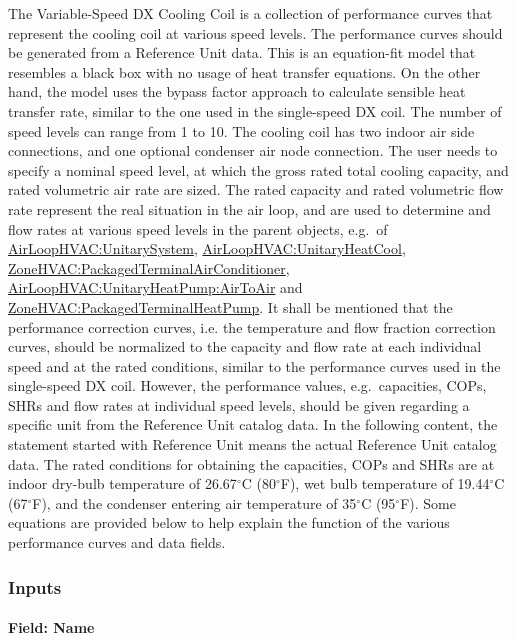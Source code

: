 The Variable-Speed DX Cooling Coil is a collection of performance curves that represent the cooling coil at various speed levels. The performance curves should be generated from a Reference Unit data. This is an equation-fit model that resembles a black box with no usage of heat transfer equations. On the other hand, the model uses the bypass factor approach to calculate sensible heat transfer rate, similar to the one used in the single-speed DX coil. The number of speed levels can range from 1 to 10. The cooling coil has two indoor air side connections, and one optional condenser air node connection. The user needs to specify a nominal speed level, at which the gross rated total cooling capacity, and rated volumetric air rate are sized. The rated capacity and rated volumetric flow rate represent the real situation in the air loop, and are used to determine and flow rates at various speed levels in the parent objects, e.g.~of \hyperref[airloophvacunitarysystem]{AirLoopHVAC:UnitarySystem}, \hyperref[airloophvacunitaryheatcool]{AirLoopHVAC:UnitaryHeatCool}, \hyperref[zonehvacpackagedterminalairconditioner]{ZoneHVAC:PackagedTerminalAirConditioner}, \hyperref[airloophvacunitaryheatpumpairtoair]{AirLoopHVAC:UnitaryHeatPump:AirToAir} and \hyperref[zonehvacpackagedterminalheatpump]{ZoneHVAC:PackagedTerminalHeatPump}. It shall be mentioned that the performance correction curves, i.e. the temperature and flow fraction correction curves, should be normalized to the capacity and flow rate at each individual speed and at the rated conditions, similar to the performance curves used in the single-speed DX coil. However, the performance values, e.g.~capacities, COPs, SHRs and flow rates at individual speed levels, should be given regarding a specific unit from the Reference Unit catalog data. In the following content, the statement started with Reference Unit means the actual Reference Unit catalog data. The rated conditions for obtaining the capacities, COPs and SHRs are at indoor dry-bulb temperature of 26.67$^\circ$C (80$^\circ$F), wet bulb temperature of 19.44$^\circ$C (67$^\circ$F), and the condenser entering air temperature of 35$^\circ$C (95$^\circ$F). Some equations are provided below to help explain the function of the various performance curves and data fields.

\subsubsection{Inputs}\label{inputs-17-001}

\paragraph{Field: Name}\label{field-name-16-002}

